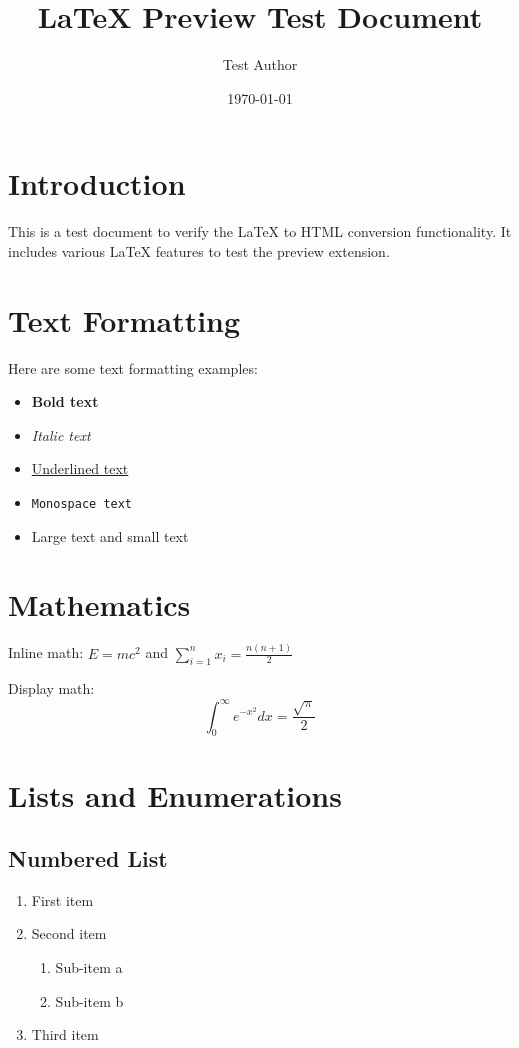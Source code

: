 \documentclass[11pt]{article}
\title{\textbf{LaTeX Preview Test Document}}
\author{Test Author}
\date{\today}
\begin{document}
\maketitle

\section{Introduction}
This is a test document to verify the LaTeX to HTML conversion functionality. It includes various LaTeX features to test the preview extension.

\section{Text Formatting}
Here are some text formatting examples:
\begin{itemize}
    \item \textbf{Bold text}
    \item \textit{Italic text}
    \item \underline{Underlined text}
    \item \texttt{Monospace text}
    \item {\Large Large text} and {\small small text}
\end{itemize}

\section{Mathematics}
Inline math: $E = mc^2$ and $\sum_{i=1}^{n} x_i = \frac{n(n+1)}{2}$

Display math:
\begin{equation}
    \int_{0}^{\infty} e^{-x^2} dx = \frac{\sqrt{\pi}}{2}
\end{equation}

\section{Lists and Enumerations}
\subsection{Numbered List}
\begin{enumerate}
    \item First item
    \item Second item
    \begin{enumerate}[label=(\alph*)]
        \item Sub-item a
        \item Sub-item b
    \end{enumerate}
    \item Third item
\end{enumerate}
\end{document}
